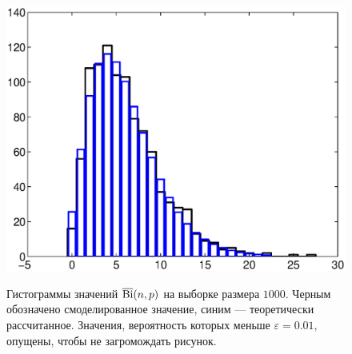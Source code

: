 \documentclass[12pt, a4paper]{article}
\begin{document}
\begin{figure}[H]
\begin{center}
{\includegraphics[scale=0.45]{nbin_r4_p04_sz1000.eps}
}
\end{center}
\caption{Гистограммы значений $\operatorname{\overline{Bi}}(n, p)$ на выборке размера $1000$. Черным обозначено смоделированное значение, синим --- теоретически рассчитанное. Значения, вероятность которых меньше $\varepsilon=0.01,$ опущены, чтобы не загромождать рисунок.}
\end{figure}
\end{document}
